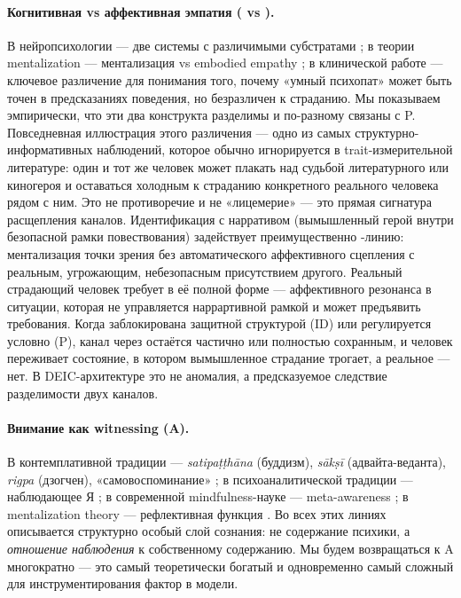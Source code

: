 \paragraph{Когнитивная vs аффективная эмпатия (\Ecog{} vs \EAF{}).}
В нейропсихологии --- две системы с различимыми субстратами \citep{shamaytsoory2011, decety2011}; в теории mentalization --- ментализация vs embodied empathy \citep{fonagy2002}; в клинической работе --- ключевое различение для понимания того, почему «умный психопат» может быть точен в предсказаниях поведения, но безразличен к страданию. Мы показываем эмпирически, что эти два конструкта разделимы и по-разному связаны с P. Повседневная иллюстрация этого различения --- одно из самых структурно-информативных наблюдений, которое обычно игнорируется в trait-измерительной литературе: один и тот же человек может плакать над судьбой литературного или киногероя и оставаться холодным к страданию конкретного реального человека рядом с ним. Это не противоречие и не «лицемерие» --- это прямая сигнатура расщепления каналов. Идентификация с нарративом (вымышленный герой внутри безопасной рамки повествования) задействует преимущественно \Ecog{}-линию: ментализация точки зрения без автоматического аффективного сцепления с реальным, угрожающим, небезопасным присутствием другого. Реальный страдающий человек требует \EAF{} в её полной форме --- аффективного резонанса в ситуации, которая не управляется наррартивной рамкой и может предъявить требования. Когда \EAF{} заблокирована защитной структурой (ID) или регулируется условно (P), канал через \Ecog{} остаётся частично или полностью сохранным, и человек переживает состояние, в котором вымышленное страдание трогает, а реальное --- нет. В DEIC-архитектуре это не аномалия, а предсказуемое следствие разделимости двух каналов.

\paragraph{Внимание как witnessing (A).}
В контемплативной традиции --- \textit{satipaṭṭhāna} (буддизм), \textit{sākṣī} (адвайта-веданта), \textit{rigpa} (дзогчен), «самовоспоминание» \citep[Гурджиев через][]{ouspensky1949}; в психоаналитической традиции --- наблюдающее Я \citep{sterba1934, kris1956}; в современной mindfulness-науке --- meta-awareness \citep{dunne2011, josipovic2014}; в mentalization theory --- рефлективная функция \citep{fonagy1997}. Во всех этих линиях описывается структурно особый слой сознания: не содержание психики, а \emph{отношение наблюдения} к собственному содержанию. Мы будем возвращаться к A многократно --- это самый теоретически богатый и одновременно самый сложный для инструментирования фактор в модели.

